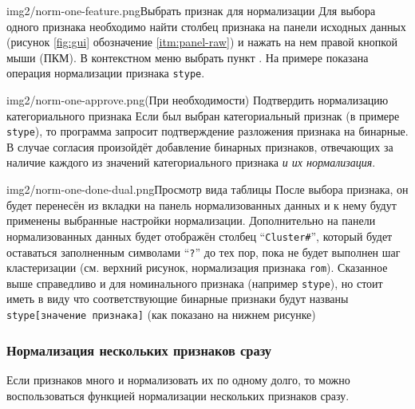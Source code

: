 \documentclass[12pt,tikz]{instruction}
\begin{document}
\begin{steps}
	\begin{ist}{img2/norm-one-feature.png}{Выбрать признак для нормализации}
		Для выбора одного признака необходимо найти столбец признака на панели исходных данных (рисунок \ref{fig:gui} обозначение 	\ref{itm:panel-raw}) и нажать на нем правой кнопкой мыши (ПКМ). В контекстном меню выбрать пункт . На примере показана операция нормализации признака \texttt{stype}.
	\end{ist}
	
	\begin{ist}{img2/norm-one-approve.png}{(При необходимости) Подтвердить нормализацию категориального признака}
		Если был выбран категориальный признак (в примере \texttt{stype}), то программа запросит подтверждение разложения признака на бинарные. В случае согласия произойдёт добавление бинарных признаков, отвечающих за наличие каждого из значений категориального признака \textit{ и их нормализация}.
	\end{ist}
		
	\begin{ist}{img2/norm-one-done-dual.png}{Просмотр вида таблицы}
		После выбора признака, он будет перенесён из вкладки на панель нормализованных данных и к нему будут применены выбранные настройки нормализации. Дополнительно на панели нормализованных данных будет отображён столбец ``\texttt{Cluster\#}'', который будет оставаться заполненным символами ``\texttt{?}'' до тех пор, пока не будет выполнен шаг кластеризации (см. верхний рисунок, нормализация признака \texttt{rom}). Сказанное выше справедливо и для номинального признака (например \texttt{stype}), но стоит иметь в виду что соответствующие бинарные признаки будут названы \texttt{stype[значение признака]} (как показано на нижнем рисунке)
	\end{ist}
		
\end{steps}

\newpage
\subsubsection{Нормализация нескольких признаков сразу}

Если признаков много и нормализовать их по одному долго, то можно воспользоваться функцией нормализации нескольких признаков сразу.
\end{document}
